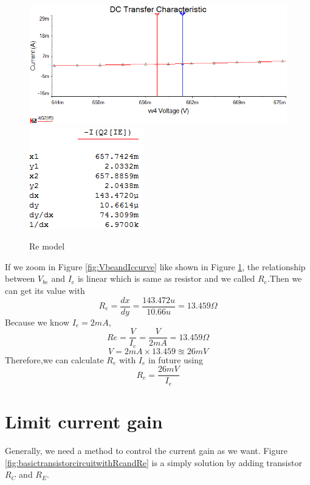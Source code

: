 \begin{figure}[htbp]
	\centering
	\includegraphics[scale=0.6]{"../Photo/Chap1/Re model"}\\[0.5cm]
	\includegraphics[scale=0.8]{"../Photo/Chap1/Re model data"}
	\caption{Re model}
	\label{fig:Re model}
\end{figure}

If we zoom in Figure \ref{fig:VbeandIccurve} like shown in Figure \ref{fig:Re model}, the relationship between $ V_{be} $ and $ I_e $ is linear which is same as resistor and we called $ R_e $.Then we can get its value with
\[ R_e = \frac{dx}{dy} = \frac{143.472u}{10.66u} = 13.459 \Omega\]
Because we know $ I_e = 2mA $, 
\[ Re = \frac{V}{I_e} = \frac{V}{2mA}=13.459\Omega\]
\[ V = 2mA \times 13.459 \approxeq 26mV \] 
Therefore,we can calculate $ R_{e} $ with $ I_e $ in future using
\begin{equation}
	R_{e} = \frac{26 mV}{I_{e}}
\end{equation}


\section{Limit current gain} 
Generally, we need a method to control the current gain as we want. Figure \ref{fig:basictransistorcircuitwithRcandRe} is a simply solution by adding transistor $R_C$ and $R_E$.


